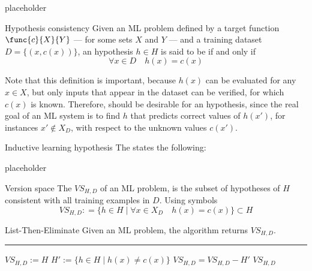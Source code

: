 \documentclass[a4paper, 12pt]{report}
\begin{document}
    placeholder 

    \begin{frameddefn}{Hypothesis consistency}
        Given an ML problem defined by a target function $\func{c}{X}{Y}$ --- for some sets $X$ and $Y$ --- and a training dataset $D = \{(x, c(x))\}$, an hypothesis $h \in H$ is said to be  if and only if $$\forall x \in D \quad h(x) = c(x)$$
    \end{frameddefn}

    Note that this definition is important, because $h(x)$ can be evaluated for any $x \in X$, but only inputs that appear in the dataset can be verified, for which $c(x)$ is known. Therefore,  should be desirable for an hypothesis, since the real goal of an ML system is to find  $h$ that predicts correct values of $h(x')$, for instances $x' \notin X_D$, with respect to the unknown values $c(x')$.

    \begin{frameddefn}{Inductive learning hypothesis}
        The  states the following: 
    \end{frameddefn}

    placeholder 

    \begin{frameddefn}{Version space}
        The  $VS_{H, D}$ of an ML problem, is the subset of hypotheses of $H$ consistent with all training examples in $D$. Using symbols $$VS_{H, D}: = \{h \in H \mid \forall x \in X_D \quad h(x) = c(x)\} \subset H$$
    \end{frameddefn}

    \begin{framedalgo}{List-Then-Eliminate}
        Given an ML problem, the algorithm returns $VS_{H, D}$. \\

        \hrule

        \quad
        \label{alg:lte}
        \begin{algorithmic}[1]
                \State $VS_{H, D} := H$ 
                    \State $H' := \{h \in H \mid h(x) \neq c(x)\}$ 
                    \State $VS_{H, D} = VS_{H, D} - H'$
                \EndFor
                \State {} $VS_{H,D}$
            \EndFunction
        \end{algorithmic}
    \end{framedalgo}
\end{document}
